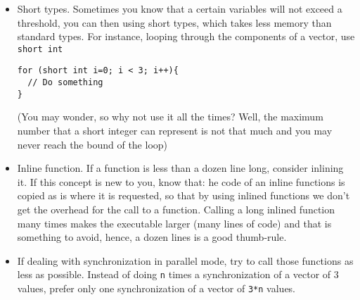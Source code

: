 \documentclass[a4paper,12pt,%
              final%
              ]{article}
\begin{document}
\begin{itemize}
      \item Short types. Sometimes you know that a certain variables will not exceed a threshold, you can then using short types, which takes less memory than standard types. For instance, looping through the components of a vector, use \texttt{short int}
\begin{verbatim}
for (short int i=0; i < 3; i++){
  // Do something
}
\end{verbatim}
        (You may wonder, so why not use it all the times? Well, the maximum number that a short integer can represent is not that much and you may never reach the bound of the loop)
      \item Inline function. If a function is less than a dozen line long, consider inlining it. If this concept is new to you, know that: he code of an inline functions is copied as is where it is requested, so that by using inlined functions we don't get the overhead for the call to a function. Calling a long inlined function many times makes the executable larger (many lines of code) and that is something to avoid, hence, a dozen lines is a good thumb-rule.
      \item If dealing with synchronization in parallel mode, try to call those functions as less as possible. Instead of doing \texttt{n} times a synchronization of a vector of 3 values, prefer only one synchronization of a vector of \texttt{3*n} values.
    \end{itemize}

\end{document}
